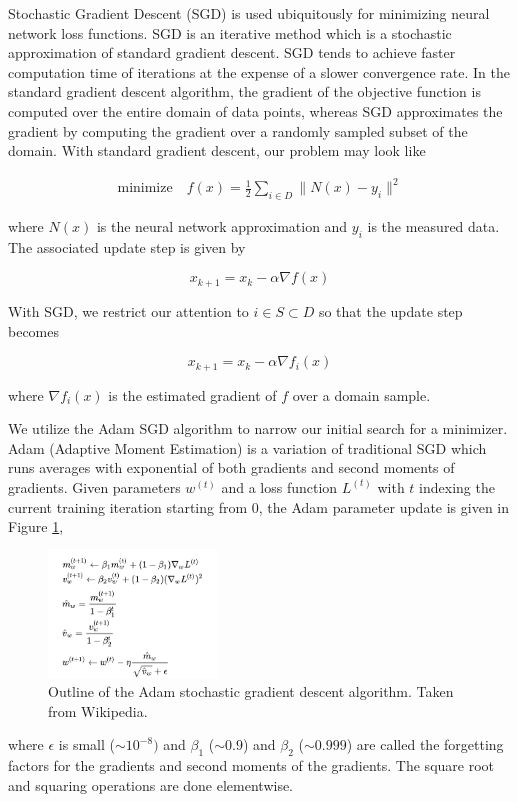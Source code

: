 Stochastic Gradient Descent (SGD) is used ubiquitously for minimizing neural network loss functions. SGD is an iterative 
method which is a stochastic approximation of standard gradient descent. SGD tends to achieve faster computation time of 
iterations at the expense of a slower convergence rate. In the standard gradient descent algorithm, the gradient of the
objective function is computed over the entire domain  of data points, whereas SGD approximates the gradient by computing
the gradient over a randomly sampled subset of the domain. With standard gradient descent, our problem may look like

\begin{align*}
    \text{minimize} \hspace{1em} f(x) = \frac{1}{2}\sum_{i \in D} \|N(x) - y_i \|^2
\end{align*}

where $N(x)$ is the neural network approximation and $y_i$ is the measured data. The associated update step is given by

$$
x_{k+1} = x_k - \alpha \nabla f(x)
$$

With SGD, we restrict our attention to $i \in S \subset D$ so that the update step becomes

$$
x_{k+1} = x_k - \alpha \nabla f_i(x)
$$

\noindent where $\nabla f_i(x)$ is the estimated gradient of $f$ over a domain sample.

We utilize the Adam SGD algorithm to narrow our initial search for a minimizer. Adam (Adaptive Moment Estimation) is a 
variation of traditional SGD which runs averages with exponential  of both gradients and second moments
of gradients. Given parameters $w^{(t)}$ and a loss function $L^{(t)}$ with $t$ indexing the current training iteration 
starting from 0, the Adam parameter update is given in Figure \ref{fig:adam_algorithm},

\begin{figure}[H]
    \includegraphics[width=0.40\textwidth]{images/adam.png}
    \centering
    \caption{Outline of the Adam stochastic gradient descent algorithm. Taken from Wikipedia.}
    \label{fig:adam_algorithm}
\end{figure}

where $\epsilon$ is small ($\sim10^{-8})$ and $\beta_1$ ($\sim0.9$) and $\beta_2$ ($\sim0.999$) are called the forgetting factors for the gradients and second moments of the gradients. The square root and squaring operations are done elementwise. 